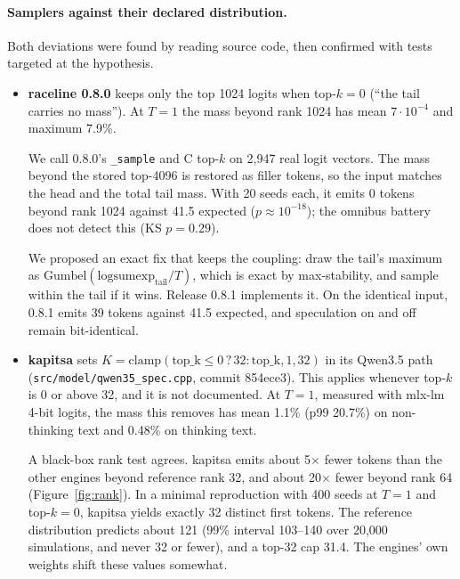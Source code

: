 \documentclass[10pt]{article}
\theoremstyle{remark}
\begin{document}
\paragraph{Samplers against their declared distribution.} Both deviations were found by reading source code, then confirmed with tests targeted at the hypothesis.
\begin{itemize}
\item \textbf{raceline 0.8.0} keeps only the top 1024 logits when top-$k{=}0$ (``the tail carries no mass''). At $T{=}1$ the mass beyond rank 1024 has mean $7\cdot10^{-4}$ and maximum 7.9\%.

We call 0.8.0's \texttt{\_sample} and C top-$k$ on 2,947 real logit vectors. The mass beyond the stored top-4096 is restored as filler tokens, so the input matches the head and the total tail mass. With 20 seeds each, it emits 0 tokens beyond rank 1024 against 41.5 expected ($p\approx10^{-18}$); the omnibus battery does not detect this (KS $p=0.29$).

We proposed an exact fix that keeps the coupling: draw the tail's maximum as $\mathrm{Gumbel}(\mathrm{logsumexp}_{\text{tail}}/T)$, which is exact by max-stability, and sample within the tail if it wins. Release 0.8.1 implements it. On the identical input, 0.8.1 emits 39 tokens against 41.5 expected, and speculation on and off remain bit-identical.
\item \textbf{kapitsa} sets $K=\mathrm{clamp}(\text{top\_k}\le0\,?\,32:\text{top\_k},1,32)$ in its Qwen3.5 path (\texttt{src/model/qwen35\_spec.cpp}, commit 854ece3). This applies whenever top-$k$ is 0 or above 32, and it is not documented. At $T{=}1$, measured with mlx-lm 4-bit logits, the mass this removes has mean 1.1\% (p99 20.7\%) on non-thinking text and 0.48\% on thinking text.

A black-box rank test agrees. kapitsa emits about 5$\times$ fewer tokens than the other engines beyond reference rank 32, and about 20$\times$ fewer beyond rank 64 (Figure~\ref{fig:rank}). In a minimal reproduction with 400 seeds at $T{=}1$ and top-$k{=}0$, kapitsa yields exactly 32 distinct first tokens. The reference distribution predicts about 121 (99\% interval 103--140 over 20,000 simulations, and never 32 or fewer), and a top-32 cap 31.4. The engines' own weights shift these values somewhat.


\end{itemize}
\end{document}
